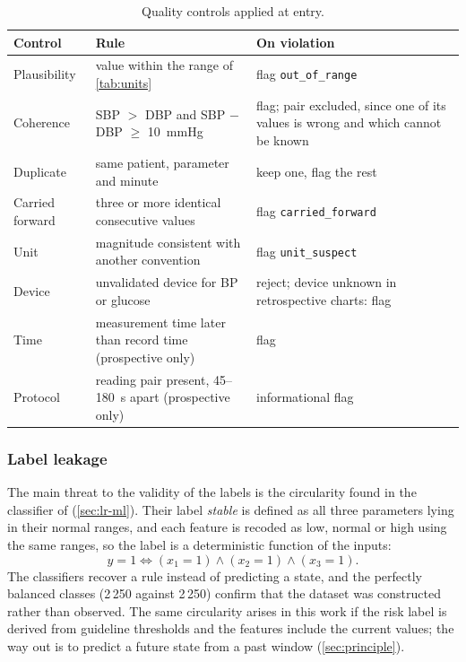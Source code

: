 \begin{table}[htbp]
\centering\footnotesize
\caption{Quality controls applied at entry.}\label{tab:quality-controls}
\begin{tabularx}{\textwidth}{@{}>{\raggedright\arraybackslash}p{3.0cm} X >{\raggedright\arraybackslash}p{3.0cm}@{}}
\toprule
\textbf{Control} & \textbf{Rule} & \textbf{On violation} \\
\midrule
Plausibility & value within the range of \cref{tab:units} & flag \texttt{out\_of\_range} \\
Coherence & SBP $>$ DBP and SBP $-$ DBP $\geq$ 10~mmHg & flag; pair excluded, since one of its values is wrong and which cannot be known \\
Duplicate & same patient, parameter and minute & keep one, flag the rest \\
Carried forward & three or more identical consecutive values & flag \texttt{carried\_forward} \\
Unit & magnitude consistent with another convention & flag \texttt{unit\_suspect} \\
Device & unvalidated device for BP or glucose & reject; device unknown in retrospective charts: flag \\
Time & measurement time later than record time (prospective only) & flag \\
Protocol & reading pair present, 45--180~s apart (prospective only) & informational flag \\
\bottomrule
\end{tabularx}
\end{table}


\subsubsection{Label leakage}\label{sec:reference-impl}\label{sec:device-validation}\label{sec:efendi-appraisal}\label{sec:leakage}

The main threat to the validity of the labels is the circularity found in the classifier of \textcite{efendi2025} (\cref{sec:lr-ml}). Their label \emph{stable} is defined as all three parameters lying in their normal ranges, and each feature is recoded as low, normal or high using the same ranges, so the label is a deterministic function of the inputs:
\begin{equation}
  y = 1 \iff (x_1 = 1) \wedge (x_2 = 1) \wedge (x_3 = 1).
\end{equation}
The classifiers recover a rule instead of predicting a state, and the perfectly balanced classes (2\,250 against 2\,250) confirm that the dataset was constructed rather than observed. The same circularity arises in this work if the risk label is derived from guideline thresholds and the features include the current values; the way out is to predict a future state from a past window (\cref{sec:principle}).

